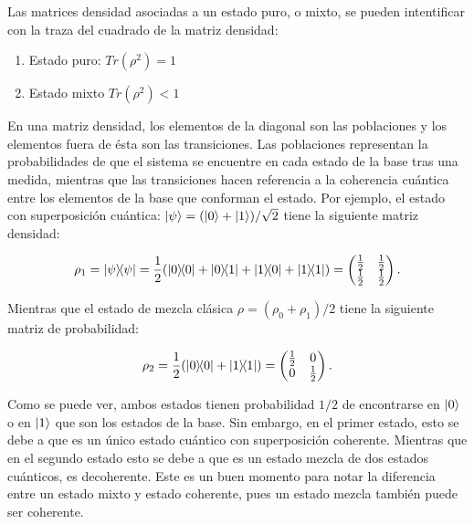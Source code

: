 Las matrices densidad asociadas a un estado puro, o mixto, se pueden intentificar con la traza del cuadrado de la matriz densidad:

\begin{enumerate}
    \item Estado puro: $Tr(\rho^2) = 1$
    \item Estado mixto $Tr(\rho^2) < 1$
\end{enumerate}

En una matriz densidad, los elementos de la diagonal son las poblaciones y los elementos fuera de ésta son las transiciones. Las poblaciones representan la probabilidades de que el sistema se encuentre en cada estado de la base tras una medida, mientras que las transiciones hacen referencia a la coherencia cuántica entre los elementos de la base que conforman el estado. Por ejemplo, el estado con superposición cuántica: $\ket{\psi} = (\ket{0} + \ket{1})/\sqrt{2}$ tiene la siguiente matriz densidad:

\begin{equation}
    \rho_1 = \ketbra{\psi}{\psi} = \frac{1}{2} (\ketbra{0}{0} + \ketbra{0}{1} + \ketbra{1}{0} + \ketbra{1}{1}) =
    \begin{pmatrix}
        \frac{1}{2} & \frac{1}{2} \\
        \frac{1}{2} & \frac{1}{2}
    \end{pmatrix} .
\end{equation}

Mientras que el estado de mezcla clásica $\rho = (\rho_0 + \rho_1)/2$ tiene la siguiente matriz de probabilidad:

\begin{equation}
    \rho_2 = \frac{1}{2} (\ketbra{0}{0} + \ketbra{1}{1}) =
    \begin{pmatrix}
        \frac{1}{2} & 0 \\
        0 & \frac{1}{2}
    \end{pmatrix} .
\end{equation}

Como se puede ver, ambos estados tienen probabilidad $1/2$ de encontrarse en $\ket{0}$ o en $\ket{1}$ que son los estados de la base. Sin embargo, en el primer estado, esto se debe a que es un único estado cuántico con superposición coherente. Mientras que en el segundo estado esto se debe a que es un estado mezcla de dos estados cuánticos, es decoherente. Este es un buen momento para notar la diferencia entre un estado mixto y estado coherente, pues un estado mezcla también puede ser coherente.

